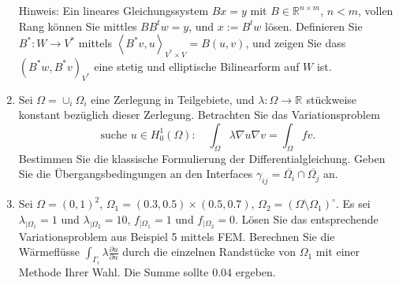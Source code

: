 \documentclass[11pt,a4paper]{report}
\newcommand{\R}[1]{\mathbb{R}^{#1}}
\begin{document}
\begin{enumerate}
Hinweis: Ein lineares Gleichungssystem $B x = y$ mit $B \in \R{n
  \times m}$, $n < m$, vollen Rang k\"onnen Sie mittles 
$B B^t w = y$, und $x := B^t w$ l\"osen. Definieren Sie $B^\ast : W
\rightarrow V^\ast$ mittels $\left<B^\ast v, u\right>_{V^\ast \times V} =
B(u,v)$, und zeigen Sie dass $(B^\ast w, B^\ast v)_{V^\ast}$ eine stetig und
elliptische Bilinearform auf $W$ ist.


\item Sei $\Omega = \cup_i \Omega_i$ eine Zerlegung in Teilgebiete, und
  $\lambda : \Omega \rightarrow \R{}$ st\"uckweise konstant bez\"uglich dieser
  Zerlegung. Betrachten Sie das Variationsproblem
$$
\text{suche } u \in H_0^1(\Omega): \quad
\int_\Omega \lambda \nabla u \nabla v = \int_\Omega f v.
$$
Bestimmen Sie die klassische Formulierung der
Differentialgleichung. Geben Sie die \"Ubergangsbedingungen an den
Interfaces $\gamma_{ij} = \overline{\Omega_i} \cap
\overline{\Omega_j}$ an.


\item Sei $\Omega = (0,1)^2$,  $\Omega_1 = (0.3,0.5) \times
  (0.5,0.7)$, $\Omega_2 = (\Omega \setminus \Omega_1)^\circ$.  
Es sei $\lambda_{|\Omega_1} = 1$ und $\lambda_{|\Omega_2} = 10$,
 $f_{|\Omega_1} = 1$ und $f_{|\Omega_2} = 0$. L\"osen Sie das
 entsprechende
Variationsproblem aus Beispiel 5 mittels FEM.
Berechnen Sie die W\"armefl\"usse $\int_{\Gamma_i} \lambda
 \frac{\partial u}{\partial n}$ durch die einzelnen  Randst\"ucke von
 $\Omega_1$ mit einer Methode Ihrer Wahl. Die Summe sollte $0.04$ ergeben.

\end{enumerate}
\end{document}
